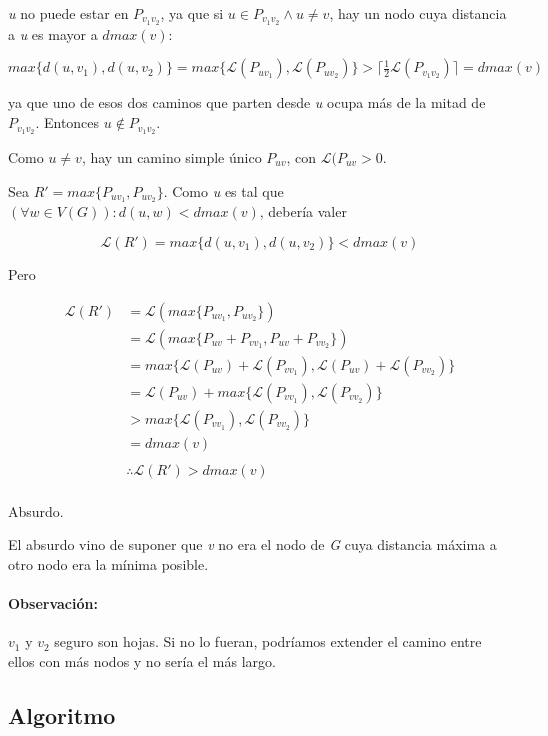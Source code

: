 \documentclass[a4paper]{report}
\begin{document}
\textit{u} no puede estar en $P_{v_{1} v_{2}}$, ya que si $u \in P_{v_{1} v_{2}} \land u \neq v$, hay un nodo cuya distancia a \textit{u} es mayor a $dmax(v)$:

$$
max \{ d(u,v_{1}), d(u,v_{2}) \} = max \{ \mathcal{L}(P_{u v_{1}}), \mathcal{L}(P_{u v_{2}}) \} > \lceil \tfrac{1}{2} \mathcal{L}(P_{v_{1} v_{2}}) \rceil = dmax(v)
$$

ya que uno de esos dos caminos que parten desde \textit{u} ocupa más de la mitad de $P_{v_{1} v_{2}}$. Entonces $u \notin P_{v_{1} v_{2}}$.

Como $u \neq v$, hay un camino simple único $P_{uv}$, con $\mathcal{L}(P_{uv} > 0$.

Sea $R' = max \{ P_{u v_{1}}, P_{u v_{2}} \}$. Como \textit{u} es tal que $(\forall w \in V(G)) : d(u,w) < dmax(v)$, debería valer

$$
\mathcal{L}(R') = max\{ d(u,v_{1}), d(u,v_{2}) \} < dmax(v)
$$

Pero

\begin{align*}
    \mathcal{L}(R') &= \mathcal{L}( max \{ P_{u v_{1}}, P_{u v_{2}} \} ) \\
    &= \mathcal{L}( max \{ P_{uv} + P_{v v_{1}}, P_{uv} + P_{v v_{2}} \} ) \\
    &= max \{ \mathcal{L}(P_{uv}) + \mathcal{L}(P_{v v_{1}}), \mathcal{L}(P_{uv}) + \mathcal{L}(P_{v v_{2}}) \} \\
    &= \mathcal{L}(P_{uv}) + max \{ \mathcal{L}(P_{v v_{1}}), \mathcal{L}(P_{v v_{2}}) \} \\
    &> max \{ \mathcal{L}(P_{v v_{1}}), \mathcal{L}(P_{v v_{2}}) \} \\
    &= dmax(v) \\
    & \\
    & \therefore \mathcal{L}(R') > dmax(v) \\
\end{align*}

Absurdo.

El absurdo vino de suponer que \textit{v} no era el nodo de \textit{G} cuya distancia máxima a otro nodo era la mínima posible.

\paragraph{Observación:} $v_{1}$ y $v_{2}$ seguro son hojas. Si no lo fueran, podríamos extender el camino entre ellos con más nodos y no sería el más largo.

\subsection{Algoritmo}
\end{document}
